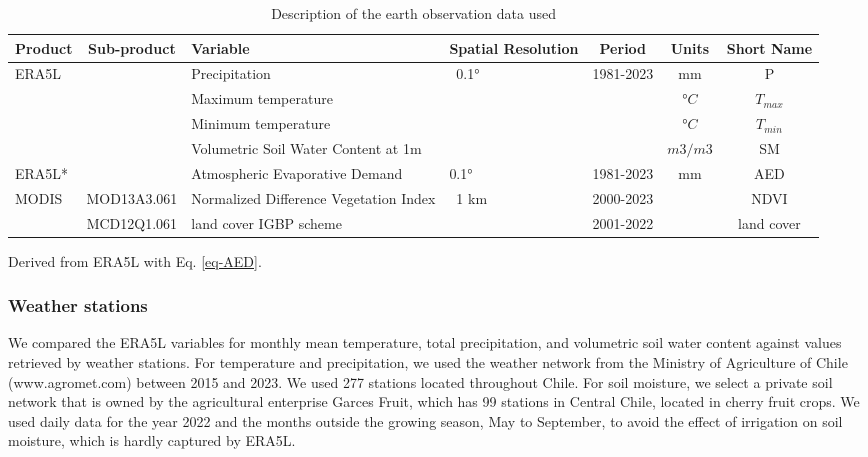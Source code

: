 \documentclass[
  number,
  preprint,
  3p,
  onecolumn]{elsarticle}
\begin{document}
\begin{table}[!ht]
\caption{Description of the earth observation data used }
\label{tab-desEOD}
\small
\centering
\begin{tabular}{p{}cp{}p{}ccc}
\hline
\multirow{1}{*}{\centering Product} & Sub-product & Variable & Spatial Resolution  & Period & Units & Short Name \\ 
\hline
\multirow{4}{*}{ERA5L} & ~ & Precipitation & \multirow{4}{*}{~0.1°} & \multirow{4}{*}{1981-2023} & mm & P \\ 
         &  & Maximum temperature & ~ & & $°C$ & $T_{max}$ \\ 
         &  & Minimum temperature & ~ & & $°C$ & $T_{min}$ \\ 
         &  & Volumetric Soil Water Content at 1m & ~ & & $m3/m3$ & SM \\ 
ERA5L* & & Atmospheric Evaporative Demand & 0.1° & 1981-2023 & mm & AED \\
        \multirow{2}{*}{MODIS} & MOD13A3.061 & Normalized Difference Vegetation Index & \multirow{2}{*}{~1 km} & 2000-2023 & ~ & NDVI \\ 
         & MCD12Q1.061 & land cover IGBP scheme & & 2001-2022 & ~ & land cover \\ 
\hline
\end{tabular}
{\raggedright *Derived from ERA5L with Eq. \ref{eq-AED}. \par}
\end{table}

\hypertarget{weather-stations}{%
\subsubsection{Weather stations}\label{weather-stations}}

We compared the ERA5L variables for monthly mean temperature, total
precipitation, and volumetric soil water content against values
retrieved by weather stations. For temperature and precipitation, we
used the weather network from the Ministry of Agriculture of Chile
(www.agromet.com) between 2015 and 2023. We used 277 stations located
throughout Chile. For soil moisture, we select a private soil network
that is owned by the agricultural enterprise Garces Fruit, which has 99
stations in Central Chile, located in cherry fruit crops. We used daily
data for the year 2022 and the months outside the growing season, May to
September, to avoid the effect of irrigation on soil moisture, which is
hardly captured by ERA5L.
\end{document}
